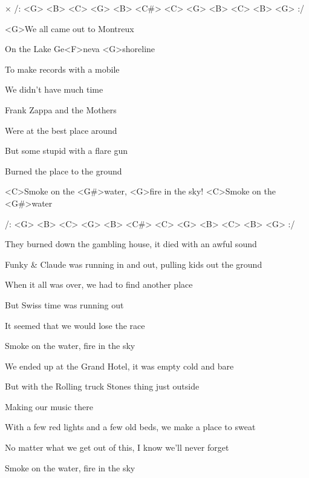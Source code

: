 

× /: <G> <B> <C> <G> <B> <C#> <C> <G> 
<B> <C> <B> <G> :/
\kr

\zs
<G>We all came out to Montreux

On the Lake Ge<F>neva <G>shoreline

To make records with a mobile

We didn't have much time

Frank Zappa and the Mothers

Were at the best place around

But some stupid with a flare gun

Burned the place to the ground
\ks

\zr
<C>Smoke on the <G#>water, <G>fire in the sky! <C>Smoke on the <G#>water

/: <G> <B> <C> <G> <B> <C#> <C> <G> <B> <C> <B> <G> :/
\kr

\zs
They burned down the gambling house,
it died with an awful sound

Funky \& Claude was running in and out,
pulling kids out the ground

When it all was over,
we had to find another place

But Swiss time was running out

It seemed that we would lose the race

Smoke on the water, fire in the sky
\ks

\zs
We ended up at the Grand Hotel,
it was empty cold and bare

But with the Rolling truck Stones thing just outside

Making our music there

With a few red lights and a few old beds,
we make a place to sweat

No matter what we get out of this,
I know we'll never forget

Smoke on the water, fire in the sky
\ks

\kp








































































